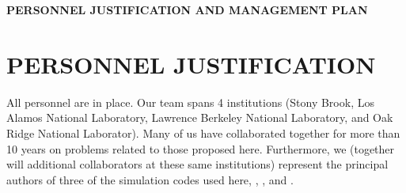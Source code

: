 \documentclass[11pt,letterpaper,english]{article}
\begin{document}


\pagestyle{fancy} 
 \renewcommand{%
\headrulewidth}{0.0pt}

\begin{center}
\bf {PERSONNEL JUSTIFICATION AND MANAGEMENT PLAN} 
\end{center}


\section{PERSONNEL JUSTIFICATION}


All personnel are in place.  Our team spans 4 institutions (Stony
Brook, Los Alamos National Laboratory, Lawrence Berkeley National
Laboratory, and Oak Ridge National Laborator).  Many of us have
collaborated together for more than 10 years on problems related to
those proposed here.  Furthermore, we (together will additional
collaborators at these same institutions) represent the principal
authors of three of the simulation codes used here, \maestro, \castro,
and \chimera.
\end{document}
